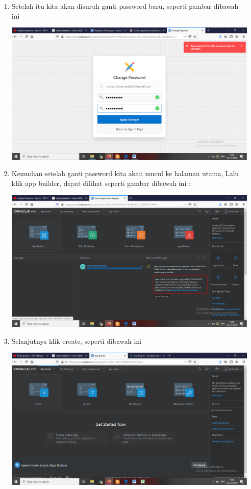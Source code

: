 \begin{enumerate}
	\item Setelah itu kita akan disuruh ganti password baru, seperti gambar dibawah ini
	\begin{center}
    \includegraphics[scale=0.2]{Apex/8.png}
    \end{center}
	
	\item Kemudian setelah ganti password kita akan mucul ke halaman utama, Lalu klik app builder, dapat dilihat seperti gambar dibawah ini :
	\begin{center}
    \includegraphics[scale=0.2]{Apex/9.png}
    \end{center}
	
	\item Selanjutnya klik create, seperti dibawah ini
	\begin{center}
    \includegraphics[scale=0.2]{Apex/10.png}
    \end{center}
    

\end{enumerate}
